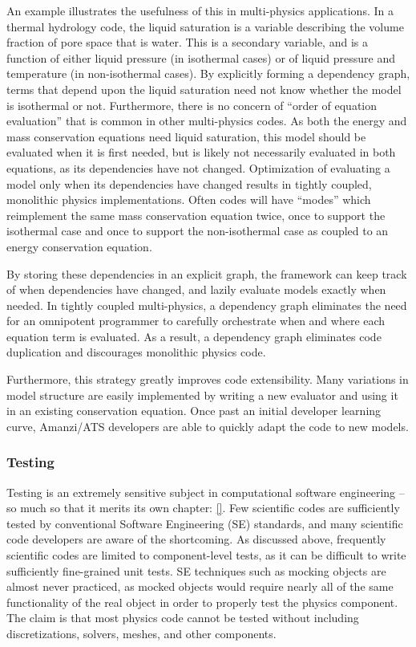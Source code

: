 An example illustrates the usefulness of this in multi-physics applications.
In a thermal hydrology code, the liquid saturation is a variable describing the volume fraction of pore space that is water.
This is a secondary variable, and is a function of either liquid pressure (in isothermal cases) or of liquid pressure and temperature (in non-isothermal cases).
By explicitly forming a dependency graph, terms that depend upon the liquid saturation need not know whether the model is isothermal or not.
Furthermore, there is no concern of ``order of equation evaluation'' that is common in other multi-physics codes.
As both the energy and mass conservation equations need liquid saturation, this model should be evaluated when it is first needed, but is likely not necessarily evaluated in both equations, as its dependencies have not changed.
Optimization of evaluating a model only when its dependencies have changed results in tightly coupled, monolithic physics implementations.
Often codes will have ``modes'' which reimplement the same mass conservation equation twice, once to support the isothermal case and once to support the non-isothermal case as coupled to an energy conservation equation.

By storing these dependencies in an explicit graph, the framework can keep track of when dependencies have changed, and lazily evaluate models exactly when needed.
In tightly coupled multi-physics, a dependency graph eliminates the need for an omnipotent programmer to carefully orchestrate when and where each equation term is evaluated.
As a result, a dependency graph eliminates code duplication and discourages monolithic physics code.

Furthermore, this strategy greatly improves code extensibility.
Many variations in model structure are easily implemented by writing a new evaluator and using it in an existing conservation equation.
Once past an initial developer learning curve, Amanzi/ATS developers are able to quickly adapt the code to new models.

\subsubsection{Testing}
\label{sec:amanzi:testing}
%
Testing is an extremely sensitive subject in computational software engineering -- so much so that it merits its own chapter: \ref{}.
Few scientific codes are sufficiently tested by conventional Software Engineering (SE) standards, and many scientific code developers are aware of the shortcoming.
As discussed above, frequently scientific codes are limited to component-level tests, as it can be difficult to write sufficiently fine-grained unit tests.
SE techniques such as mocking objects are almost never practiced, as mocked objects would require nearly all of the same functionality of the real object in order to properly test the physics component.
The claim is that most physics code cannot be tested without including discretizations, solvers, meshes, and other components.

